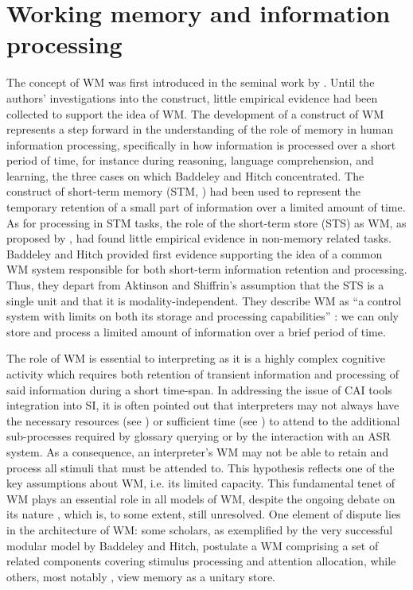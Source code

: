 \section{Working memory and information processing} \label{workingmemory}
The concept of WM was first introduced in the seminal work by \citet{bower_working_1974}. Until the authors' investigations into the construct, little empirical evidence had been collected to support the idea of WM. The development of a construct of WM represents a step forward in the understanding of the role of memory in human information processing, specifically in how information is processed over a short period of time, for instance during reasoning, language comprehension, and learning, the three cases on which Baddeley and Hitch concentrated. The construct of short-term memory (STM, \citealt{atkinson_human_1968}) had been used to represent the temporary retention of a small part of information over a limited amount of time. As for processing in STM tasks, the role of the short-term store (STS) as WM, as proposed by \citet{atkinson_human_1968,atkinson_control_1971}, had found little empirical evidence in non-memory related tasks. Baddeley and Hitch provided first evidence supporting the idea of a common WM system responsible for both short-term information retention and processing. Thus, they depart from Aktinson and Shiffrin's assumption that the STS is a single unit and that it is modality-independent. They describe WM as ``a control system with limits on both its storage and processing capabilities'' \citep[86]{bower_working_1974}: we can only store and process a limited amount of information over a brief period of time.


The role of WM is essential to interpreting as it is a highly complex cognitive activity which requires both retention of transient information and processing of said information during a short time-span. In addressing the issue of CAI tools integration into SI, it is often pointed out that interpreters may not always have the necessary resources (see ) or sufficient time (see ) to attend to the additional sub-processes required by glossary querying or by the interaction with an ASR system. As a consequence, an interpreter's WM may not be able to retain and process all stimuli that must be attended to. This hypothesis reflects one of the key assumptions about WM, i.e. its limited capacity. This fundamental tenet of WM plays an essential role in all models of WM, despite the ongoing debate on its nature \citep[3474]{seel_encyclopedia_2012}, which is, to some extent, still unresolved. One element of dispute lies in the architecture of WM: some scholars, as exemplified by the very successful modular model by Baddeley and Hitch, postulate a WM comprising a set of related components covering stimulus processing and attention allocation, while others, most notably \citet{cowan_evolving_1988}, view memory as a unitary store.


